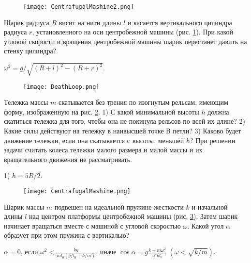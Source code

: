 \begin{ex}  %

\begin{figure}[h]
\centering
\texttt{[image: CentrafugalMashine2.png]}
\caption{}
\label{CentrafugalMashine2}
\end{figure}

Шарик радиуса $R$ висит на нити длины $l$ и касается вертикального цилиндра радиуса $r$, установленного на оси центробежной машины (рис. \ref{CentrafugalMashine2}). При какой угловой скорости и вращения центробежной машины шарик перестанет давить на стенку цилиндра?

\begin{ans}
$\omega^2 = g/\sqrt{(R+l)^2-(R+r)^2}$.
\end{ans}
\end{ex}	

\begin{ex} %

\begin{figure}[h]
\centering
\texttt{[image: DeathLoop.png]}
\caption{}
\label{DeathLoop}
\end{figure}

Тележка массы $m$ скатывается без трения по изогнутым рельсам, имеющим форму, изображенную на рис. \ref{DeathLoop}. 1) С какой минимальной высоты $h$ должна скатиться тележка для того, чтобы она не покинула рельсов по всей их длине? 2) Какие силы действуют на тележку в наивысшей точке $В$ петли? 3) Каково будет движение тележки, если она скатывается с высоты, меньшей $h$? При решении задачи считать колеса тележки малого размера и малой массы и их вращательного движения не рассматривать.
\begin{ans}
1) $h=5R/2$.
\end{ans}
\end{ex}	

\begin{ex} %

\begin{figure}[h]
\centering
\texttt{[image: CentrafugalMashine.png]}
\caption{}
\label{CentrafugalMashine}
\end{figure}

Шарик массы $m$ подвешен на идеальной пружине жесткости $k$ и начальной длины $l$ над центром платформы центробежной машины (рис. \ref{CentrafugalMashine}). Затем шарик начинает вращаться вместе с машиной с угловой скоростью $\omega$. Какой угол $\alpha$ образует при этом пружина с вертикалью?

\begin{ans}
$\alpha = 0$, если $\omega^2 < \frac{kg}{ml_0(g/l_0 + k/m)}$, иначе $\cos \alpha = g\frac{k-m\omega^2}{\omega^2kl_0}$ $\left( \omega < \sqrt{k/m} \right)$.
\end{ans}
\end{ex}	

\clearpage